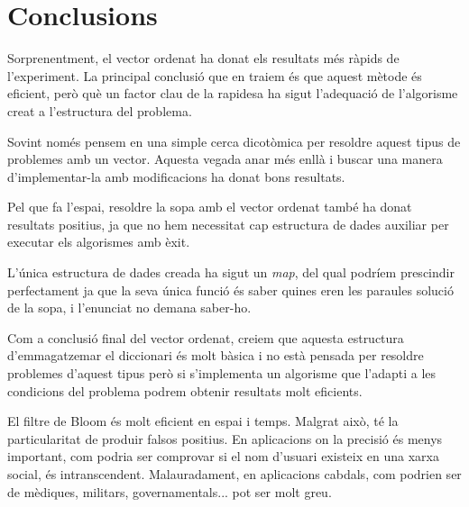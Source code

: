 \documentclass[titlepage]{article}
\begin{document}
\clearpage
\section{Conclusions}
Sorprenentment, el vector ordenat ha donat els resultats més ràpids de l'experiment. La principal conclusió que en traiem és que aquest mètode és eficient, però què un factor clau de la rapidesa ha sigut l'adequació de l'algorisme creat a l'estructura del problema.
\newline\par
Sovint només pensem en una simple cerca dicotòmica per resoldre aquest tipus de problemes amb un vector. Aquesta vegada anar més enllà i buscar una manera d'implementar-la amb modificacions ha donat bons resultats.
\newline\par
Pel que fa l'espai, resoldre la sopa amb el vector ordenat també ha donat resultats positius, ja que no hem necessitat cap estructura de dades auxiliar per executar els algorismes amb èxit.
\newline\par
L'única estructura de dades creada ha sigut un \textit{map}, del qual podríem prescindir perfectament ja que la seva única funció és saber quines eren les paraules solució de la sopa, i l'enunciat no demana saber-ho.
\newline\par
Com a conclusió final del vector ordenat, creiem que aquesta estructura d'emmagatzemar el diccionari és molt bàsica i no està pensada per resoldre problemes d'aquest tipus però si s'implementa un algorisme que l'adapti a les condicions del problema podrem obtenir resultats molt eficients.\newline

El filtre de Bloom és molt eficient en espai i temps. Malgrat això, té la particularitat de produir falsos positius. En aplicacions on la precisió és menys important, com podria ser comprovar si el nom d'usuari existeix en una xarxa social, és intranscendent. Malauradament, en aplicacions cabdals, com podrien ser de mèdiques, militars, governamentals... pot ser molt greu. 

\clearpage
\end{document}
